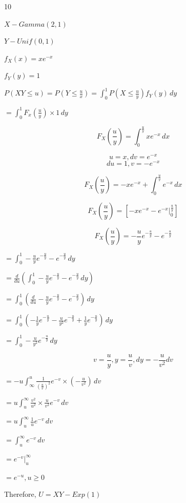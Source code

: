 \documentclass[12 pt]{article}
\begin{document}
    \begin{exercise}{10}
    \hfill

    $X-Gamma(2,1)$

    $Y-Unif(0,1)$

    \hfill

    $f_X(x) = xe^{-x}$

    $f_Y(y) = 1$

    \hfill

    $P(XY \leq u) = P(Y \leq \frac{u}{x}) = \int_{0}^{1} P(X \leq \frac{u}{y}) f_Y(y) \, dy$

    $= \int_{0}^{1} F_x(\frac{u}{y}) \times 1 \, dy$

    $$F_X(\frac{u}{y}) = \int_{0}^{\frac{u}{y}} x e^{-x} \, dx$$

    $$u=x, dv=e^{-x}$$
    $$du = 1, v=-e^{-x}$$

    $$F_X(\frac{u}{y}) = -xe^{-x} + \int_{0}^{\frac{u}{y}} e^{-x} \, dx$$

    $$F_X(\frac{u}{y}) = [-xe^{-x} - e^{-x} |_{0}^{\frac{u}{y}}]$$

    $$F_X(\frac{u}{y}) = -\frac{u}{y} e^{-\frac{u}{y}} - e^{-\frac{u}{y}}$$

    $= \int_{0}^{1} -\frac{u}{y}e^{-\frac{u}{y}} - e^{-\frac{u}{y}} \, dy$

    $= \frac{d}{du}(\int_{0}^{1} -\frac{u}{y}e^{-\frac{u}{y}} - e^{-\frac{u}{y}} \, dy)$

    $= \int_{0}^{1}(\frac{d}{du} -\frac{u}{y} e^{-\frac{u}{y}} - e^{-\frac{u}{y}}) \, dy$

    $= \int_{0}^{1} (-\frac{1}{y} e^{-\frac{u}{y}} - \frac{u}{y^2} e^{-\frac{u}{y}} + \frac{1}{y}e^{-\frac{u}{y}}) \, dy$

    $= \int_{0}^{1} - \frac{u}{y^2} e^{-\frac{u}{y}} \, dy$

    $$v = \frac{u}{y}, y = \frac{u}{v}, dy = -\frac{u}{v^2} dv$$

    $= -u \int_{\infty}^{u} \frac{1}{(\frac{u}{v})^2}e^{-v} \times (-\frac{u}{v^2}) \, dv$

    $= u \int_{u}^{\infty} \frac{v^2}{u^2} \times \frac{u}{v^2} e^{-v} \, dv$

    $= u \int_{u}^{\infty} \frac{1}{u} e^{-v} \, dv$

    $= \int_{u}^{\infty} e^{-v} \, dv$

    $= e^{-v} |_{u}^{\infty}$

    $= e^{-u}, u \geq 0$

    Therefore,
    $U=XY-Exp(1)$

    \hfill
    \end{exercise}
\end{document}
